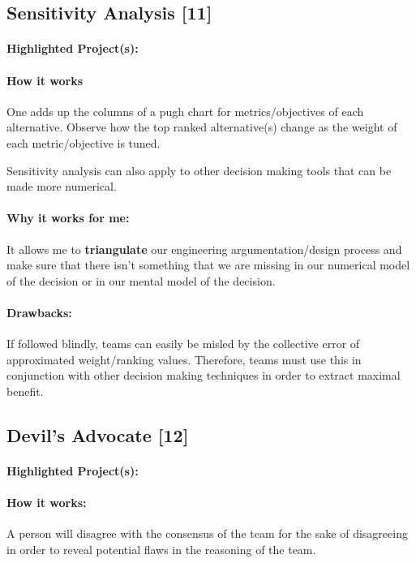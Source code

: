 \documentclass[a4paper,12pt]{article}
\begin{document}
\subsection{Sensitivity Analysis [11]}
\paragraph{Highlighted Project(s): }
\paragraph{How it works}
One adds up the columns of a pugh chart for metrics/objectives of each alternative. Observe how the top ranked alternative(s) change as the weight of each metric/objective is tuned.

Sensitivity analysis can also apply to other decision making tools that can be made more numerical.

\paragraph{Why it works for me: }
It allows me to \textbf{triangulate} our engineering argumentation/design process and make sure that there isn’t something that we are missing in our numerical model of the decision or in our mental model of the decision.

\paragraph{Drawbacks: }
If followed blindly, teams can easily be misled by the collective error of approximated weight/ranking values. Therefore, teams must use this in conjunction with other decision making techniques in order to extract maximal benefit.

\subsection{Devil’s Advocate [12]}
\paragraph{Highlighted Project(s): }

\paragraph{How it works: }
A person will disagree with the consensus of the team for the sake of disagreeing in order to reveal potential flaws in the reasoning of the team.
\end{document}
